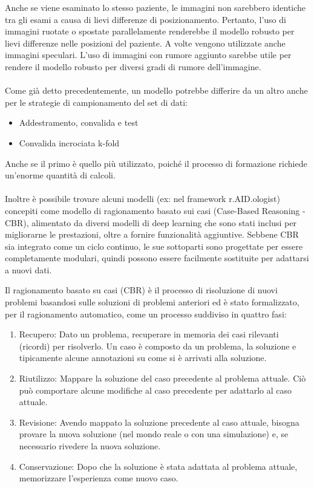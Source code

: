 \documentclass[12pt,a4paper]{report}
\begin{document}
Anche se viene esaminato lo stesso paziente, le immagini non sarebbero identiche tra gli esami a causa di lievi differenze di posizionamento. 
Pertanto, l'uso di immagini ruotate o spostate parallelamente renderebbe il modello robusto per lievi differenze nelle posizioni del paziente. A volte vengono utilizzate anche immagini speculari. L'uso di immagini con rumore aggiunto sarebbe utile per rendere il modello robusto per diversi gradi di rumore dell'immagine.\\
\\
Come già detto precedentemente, un modello potrebbe differire da un altro anche per le strategie di campionamento del set di dati:
\begin{itemize}
    \item Addestramento, convalida e test
    \item Convalida incrociata k-fold
\end{itemize}
Anche se il primo è quello più utilizzato, poiché il processo di formazione richiede un'enorme quantità di calcoli.\\
\\
Inoltre è possibile trovare alcuni modelli (ex: nel framework r.AID.ologist) concepiti come modello di ragionamento basato sui casi (Case-Based Reasoning - CBR), alimentato da diversi modelli di deep learning che sono stati inclusi per migliorarne le prestazioni, oltre a fornire funzionalità aggiuntive.
Sebbene CBR sia integrato come un ciclo continuo, le sue sottoparti sono progettate per essere completamente modulari, quindi possono essere facilmente sostituite per adattarsi a nuovi dati.

Il ragionamento basato su casi (CBR) è il processo di risoluzione di nuovi problemi basandosi sulle soluzioni di problemi anteriori ed è stato formalizzato, per il ragionamento automatico, come un processo suddiviso in quattro fasi:
\begin{enumerate}
\item Recupero: Dato un problema, recuperare in memoria dei casi rilevanti (ricordi) per risolverlo. Un caso è composto da un problema, la soluzione e tipicamente alcune annotazioni su come si è arrivati alla soluzione.
\item Riutilizzo: Mappare la soluzione del caso precedente al problema attuale. Ciò può comportare alcune modifiche al caso precedente per adattarlo al caso attuale.
\item Revisione: Avendo mappato la soluzione precedente al caso attuale, bisogna provare la nuova soluzione (nel mondo reale o con una simulazione) e, se necessario rivedere la nuova soluzione.
\item Conservazione: Dopo che la soluzione è stata adattata al problema attuale, memorizzare l'esperienza come nuovo caso.
\end{enumerate}
\end{document}
